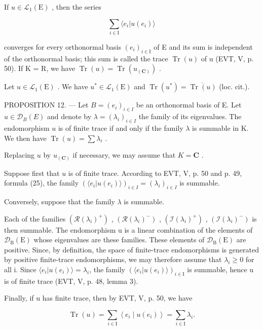 If \(u\in \mathcal{L}_1(\mathrm{E})\) , then the series

\[
\sum_ {i \in \mathrm{I}} \langle e _ {i} | u (e _ {i}) \rangle
\]

converges for every orthonormal basis \((e_{i})_{i\in\mathrm{I}}\) of E and its sum is independent of the orthonormal basis; this sum is called the trace \(\operatorname{Tr}(u)\) of u (EVT, V, p. 50). If K = R, we have \(\operatorname{Tr}(u) = \operatorname{Tr}(u_{(\mathbf{C})})\) .

Let \(u \in \mathcal{L}_1(\mathrm{E})\) . We have \(u^* \in \mathcal{L}_1(\mathrm{E})\) and \(\operatorname{Tr}(u^*) = \overline{\operatorname{Tr}(u)}\) (loc. cit.).

PROPOSITION 12. --- Let \(B = (e_i)_{i \in I}\) be an orthonormal basis of E. Let \(u \in \mathcal{D}_B(E)\) and denote by \(\lambda = (\lambda_i)_{i \in I}\) the family of its eigenvalues. The endomorphism \(u\) is of finite trace if and only if the family \(\lambda\) is summable in K. We then have \(\operatorname{Tr}(u) = \sum \lambda_i\) .

Replacing \(u\) by \(u_{(\mathbf{C})}\) if necessary, we may assume that \(K = \mathbf{C}\) .

Suppose first that \(u\) is of finite trace. According to EVT, V, p. 50 and p. 49, formula (25), the family \((\langle e_i | u(e_i) \rangle)_{i \in I} = (\lambda_i)_{i \in I}\) is summable.

Conversely, suppose that the family \(\lambda\) is summable.

Each of the families \((\mathcal{R}(\lambda_{i})^{+})\) , \((\mathcal{R}(\lambda_{i})^{-})\) , \((\mathcal{I}(\lambda_{i})^{+})\) , \((\mathcal{I}(\lambda_{i})^{-})\) is then summable. The endomorphism u is a linear combination of the elements of \(\mathcal{D}_{\mathrm{B}}(\mathrm{E})\) whose eigenvalues are these families. These elements of \(\mathcal{D}_{\mathrm{B}}(\mathrm{E})\) are positive. Since, by definition, the space of finite-trace endomorphisms is generated by positive finite-trace endomorphisms, we may therefore assume that \(\lambda_{i} \geqslant 0\) for all i. Since \(\langle e_{i} | u(e_{i}) \rangle = \lambda_{i}\), the family \((\langle e_{i} | u(e_{i}) \rangle)_{i \in \mathrm{I}}\) is summable, hence u is of finite trace (EVT, V, p. 48, lemma 3).

Finally, if u has finite trace, then by EVT, V, p. 50, we have

\[
\operatorname{Tr} (u) = \sum_ {i \in \mathrm{I}} \left\langle e _ {i} \mid u \left(e _ {i}\right) \right\rangle = \sum_ {i \in \mathrm{I}} \lambda_ {i}.
\]

